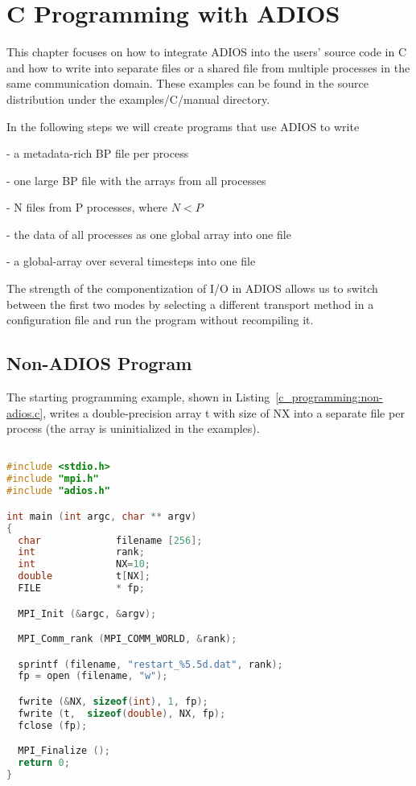 \chapter{C Programming with ADIOS}

This chapter focuses on how to integrate ADIOS into the users' source code in C 
and how to write into separate files or a shared file from multiple processes in 
the same communication domain. These examples can be found in the source distribution 
under the examples/C/manual directory.

In the following steps we will create programs that use ADIOS to write

- a metadata-rich BP file per process

- one large BP file with the arrays from all processes

- N files from P processes, where $N<P$

- the data of all processes as one global array into one file

- a global-array over several timesteps into one file

The strength of the componentization of I/O in ADIOS allows us to switch between 
the first two modes by selecting a different transport method in a configuration 
file and run the program without recompiling it. 

\section{Non-ADIOS Program}

The starting programming example, shown in Listing~\ref{c_programming:non-adios.c}, writes a double-precision 
array t with size of NX into a separate file per process (the array is uninitialized 
in the examples). 

\begin{lstlisting}[language=C,caption=Original program
  (examples/C/manual/1\_nonadios\_example.c]

#include <stdio.h>
#include "mpi.h"
#include "adios.h"

int main (int argc, char ** argv) 
{
  char             filename [256];
  int              rank;
  int              NX=10;
  double           t[NX];
  FILE             * fp;

  MPI_Init (&argc, &argv);

  MPI_Comm_rank (MPI_COMM_WORLD, &rank);

  sprintf (filename, "restart_%5.5d.dat", rank);
  fp = open (filename, "w");

  fwrite (&NX, sizeof(int), 1, fp);
  fwrite (t,  sizeof(double), NX, fp);
  fclose (fp);

  MPI_Finalize ();
  return 0;
}
\end{lstlisting}\label{c_programming:non-adios.c}

